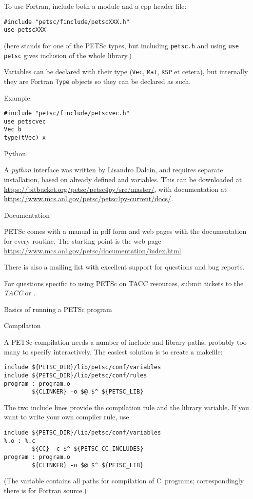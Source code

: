 To use Fortran, include both a module and a cpp header file:
\begin{verbatim}
#include "petsc/finclude/petscXXX.h"
use petscXXX
\end{verbatim}
(here  stands for one of the PETSc types, but including
\lstinline{petsc.h} and using \lstinline{use petsc}
gives inclusion of the whole library.)

Variables can be declared with their type (\lstinline{Vec},
\lstinline{Mat}, \lstinline{KSP} et cetera), but internally they are
Fortran \lstinline{Type} objects so they can be declared as such.

Example:
\begin{lstlisting}
#include "petsc/finclude/petscvec.h"
use petscvec
Vec b
type(tVec) x
\end{lstlisting}

 {Python}

A \emph{python} interface was written by
Lisandro Dalcin, and requires separate installation, based on already
defined  and 
variables.  This can be downloaded at
\url{https://bitbucket.org/petsc/petsc4py/src/master/}, with
documentation at
\url{https://www.mcs.anl.gov/petsc/petsc4py-current/docs/}.

 {Documentation}

PETSc comes with a manual in pdf form and web pages with the
documentation for every routine. The starting point is the web page
\url{https://www.mcs.anl.gov/petsc/documentation/index.html}.

There is also a mailing list with excellent support for questions and
bug reports.
\begin{taccnote}
  For questions specific to using PETSc on TACC resources, submit
  tickets to the \emph{TACC} or
  .
\end{taccnote}

 {Basics of running a PETSc program}

 {Compilation}

A PETSc compilation needs a number of include and library paths,
probably too many to specify interactively. The easiest solution is to
create a makefile:
\begin{verbatim}
include ${PETSC_DIR}/lib/petsc/conf/variables
include ${PETSC_DIR}/lib/petsc/conf/rules
program : program.o
        ${CLINKER} -o $@ $^ ${PETSC_LIB}
\end{verbatim}
The two include lines provide the compilation rule and the library
variable. If you want to write your own compiler rule, use
\begin{verbatim}
include ${PETSC_DIR}/lib/petsc/conf/variables
%.o : %.c
        ${CC} -c $^ ${PETSC_CC_INCLUDES}
program : program.o
        ${CLINKER} -o $@ $^ ${PETSC_LIB}
\end{verbatim}
(The  variable contains all paths for
compilation of C~programs; correspondingly there is
 for Fortran source.)

